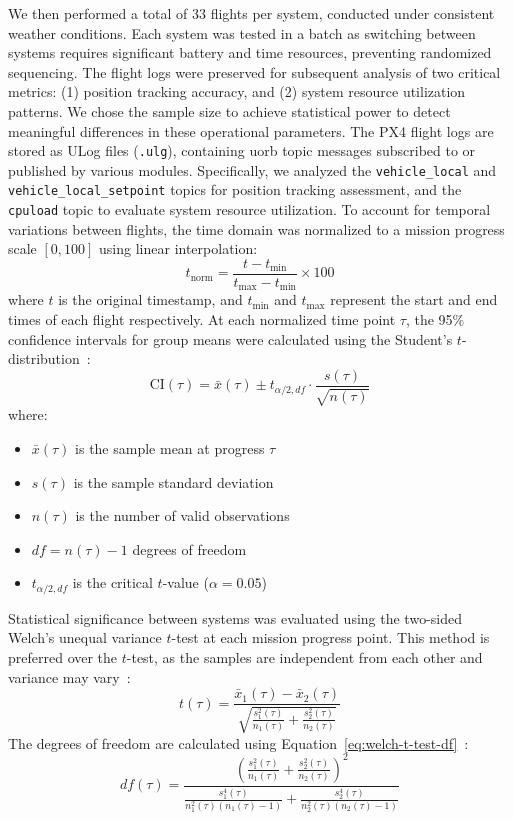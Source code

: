 We then performed a total of 33 flights per system, conducted under consistent
weather conditions. Each system was tested in a batch as switching
between systems requires significant battery and time resources, preventing
randomized sequencing.
The flight logs were preserved for subsequent analysis of two critical metrics:
(1) position tracking accuracy, and (2) system resource utilization patterns.
We chose the sample size to achieve statistical power to detect meaningful
differences in these operational parameters.
%
The PX4 flight logs are stored as ULog files (\lstinline{.ulg}), containing
\gls{uorb} topic messages subscribed to or published by various
modules. Specifically, we analyzed the \lstinline{vehicle_local} and
\lstinline{vehicle_local_setpoint} topics for position tracking assessment, and
the \lstinline{cpuload} topic to evaluate system resource
utilization.
%
To account for temporal variations between flights, the time domain was
normalized to a mission progress scale $[0, 100]$ using linear interpolation:
\begin{equation}
t_{\text{norm}} = \frac{t - t_{\min}}{t_{\max} - t_{\min}} \times 100
\end{equation}
where $t$ is the original timestamp, and $t_{\min}$ and $t_{\max}$ represent the start and end times of each flight respectively.
%
At each normalized time point $\tau$, the 95\% confidence intervals for group
means were calculated using the Student's $t$-distribution~\cite{t-test}:
\begin{equation}
\text{CI}(\tau) = \bar{x}(\tau) \pm t_{\alpha/2, df} \cdot \frac{s(\tau)}{\sqrt{n(\tau)}}
\end{equation}
where:
\begin{itemize}
    \item $\bar{x}(\tau)$ is the sample mean at progress $\tau$
    \item $s(\tau)$ is the sample standard deviation
    \item $n(\tau)$ is the number of valid observations
    \item $df = n(\tau) - 1$ degrees of freedom
    \item $t_{\alpha/2, df}$ is the critical $t$-value ($\alpha = 0.05$)
\end{itemize}

Statistical significance between systems was evaluated using the two-sided
Welch's unequal variance $t$-test at each mission progress point. This method is
preferred over the $t$-test, as the samples are independent from each other and variance may vary~\cite{welch-t-test}:
\begin{equation}
  \label{eq:welch-t-test}
t(\tau) = \frac{\bar{x}_1(\tau) - \bar{x}_2(\tau)}{\sqrt{\frac{s_1^2(\tau)}{n_1(\tau)} + \frac{s_2^2(\tau)}{n_2(\tau)}}}
\end{equation}
%
The degrees of freedom are calculated using Equation~\ref{eq:welch-t-test-df}~\cite{welch-t-test}:
%
\begin{equation}
  \label{eq:welch-t-test-df}
df(\tau) = \frac{\left( \frac{s_1^2(\tau)}{n_1(\tau)} + \frac{s_2^2(\tau)}{n_2(\tau)} \right)^2}{\frac{s_1^4(\tau)}{n_1^2(\tau)(n_1(\tau)-1)} + \frac{s_2^4(\tau)}{n_2^2(\tau)(n_2(\tau)-1)}}
\end{equation}

